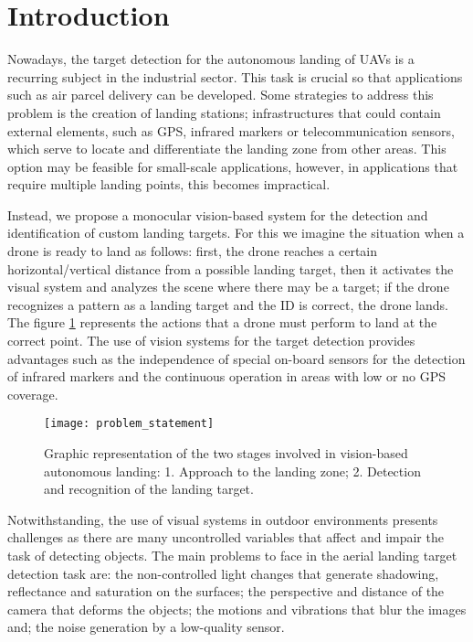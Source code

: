 \section{Introduction}\label{sec:introduction_ch1}
Nowadays, the target detection for the autonomous landing of UAVs is a recurring subject in the industrial sector. This task is crucial so that applications such as air parcel delivery can be developed. Some strategies to address this problem is the creation of landing stations; infrastructures that could contain external elements, such as GPS, infrared markers or telecommunication sensors, which serve to locate and differentiate the landing zone from other areas. This option may be feasible for small-scale applications, however, in applications that require multiple landing points, this becomes impractical.

Instead, we propose a monocular vision-based system for the detection and identification of custom landing targets. For this we imagine the situation when a drone is ready to land as follows: first, the drone reaches a certain horizontal/vertical distance from a possible landing target, then it activates the visual system and analyzes the scene where there may be a target; if the drone recognizes a pattern as a landing target and the ID is correct, the drone lands. The figure \ref{fig:visionbased_landing_problem_sketch} represents the actions that a drone must perform to land at the correct point. The use of vision systems for the target detection provides advantages such as the independence of special on-board sensors for the detection of infrared markers and the  continuous operation in areas with low or no GPS coverage. 

\begin{figure}[!ht]
    \centering
    \texttt{[image: problem\_statement]}        
    \caption{Graphic representation of the two stages involved in vision-based autonomous landing: 1. Approach to the landing zone; 2. Detection and recognition of the landing target.}\label{fig:visionbased_landing_problem_sketch}
\end{figure}

Notwithstanding, the use of visual systems in outdoor environments presents challenges as there are many uncontrolled variables that affect and impair the task of detecting objects. The main problems to face in the aerial landing target detection task are: the non-controlled light changes that generate shadowing, reflectance and saturation on the surfaces; the perspective and distance of the camera that deforms the objects; the motions and vibrations that blur the images and; the noise generation by a low-quality sensor.

